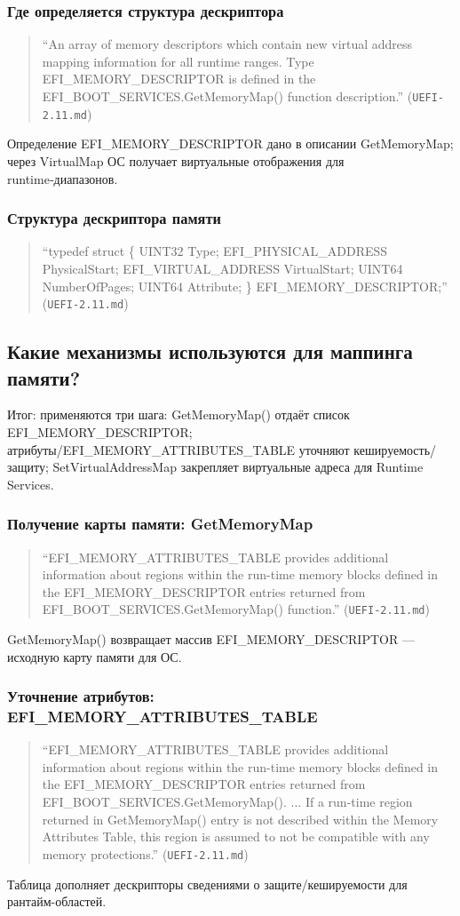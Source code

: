 \documentclass[a4paper,12pt]{article}
\begin{document}
\subsubsection{Где определяется структура дескриптора}
\begin{quote}
``An array of memory descriptors which contain new virtual address mapping information for all runtime ranges. Type EFI\_MEMORY\_DESCRIPTOR is defined in the EFI\_BOOT\_SERVICES.GetMemoryMap() function description.'' (\texttt{UEFI-2.11.md})
\end{quote}
Определение EFI\_MEMORY\_DESCRIPTOR дано в описании GetMemoryMap; через VirtualMap ОС получает виртуальные отображения для runtime‑диапазонов.


\subsubsection{Структура дескриптора памяти}
\begin{quote}
``typedef struct \{ UINT32 Type; EFI\_PHYSICAL\_ADDRESS PhysicalStart; EFI\_VIRTUAL\_ADDRESS VirtualStart; UINT64 NumberOfPages; UINT64 Attribute; \} EFI\_MEMORY\_DESCRIPTOR;'' (\texttt{UEFI-2.11.md})
\end{quote}

\subsection{Какие механизмы используются для маппинга памяти?}
Итог: применяются три шага: GetMemoryMap() отдаёт список EFI\_MEMORY\_DESCRIPTOR; атрибуты/EFI\_MEMORY\_ATTRIBUTES\_TABLE уточняют кешируемость/защиту; SetVirtualAddressMap закрепляет виртуальные адреса для Runtime Services.
\subsubsection{Получение карты памяти: GetMemoryMap}
\begin{quote}
``EFI\_MEMORY\_ATTRIBUTES\_TABLE provides additional information about regions within the run-time memory blocks defined in the EFI\_MEMORY\_DESCRIPTOR entries returned from EFI\_BOOT\_SERVICES.GetMemoryMap() function.'' (\texttt{UEFI-2.11.md})
\end{quote}
GetMemoryMap() возвращает массив EFI\_MEMORY\_DESCRIPTOR — исходную карту памяти для ОС.
\subsubsection{Уточнение атрибутов: EFI\_MEMORY\_ATTRIBUTES\_TABLE}
\begin{quote}
``EFI\_MEMORY\_ATTRIBUTES\_TABLE provides additional information about regions within the run-time memory blocks defined in the EFI\_MEMORY\_DESCRIPTOR entries returned from EFI\_BOOT\_SERVICES.GetMemoryMap(). ... If a run-time region returned in GetMemoryMap() entry is not described within the Memory Attributes Table, this region is assumed to not be compatible with any memory protections.'' (\texttt{UEFI-2.11.md})
\end{quote}
Таблица дополняет дескрипторы сведениями о защите/кешируемости для рантайм-областей.
\end{document}
